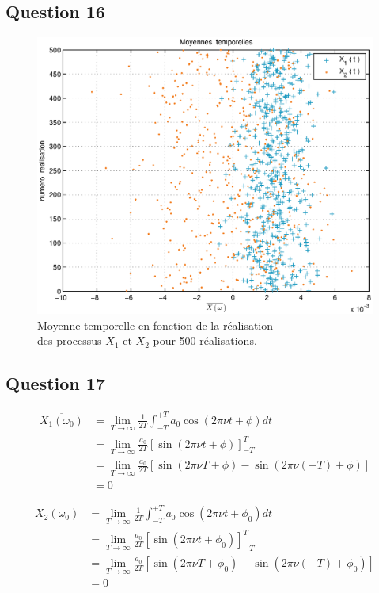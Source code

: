 \documentclass{article}
\begin{document}
\subsection*{Question 16}
\begin{figure}[h]
\centering
\includegraphics[width=12cm]{q16.eps}
\caption{Moyenne temporelle en fonction de la réalisation\\des processus $X_1$ et $X_2$ pour 500 réalisations.}
\label{fig:moytemp}
\end{figure}


\subsection*{Question 17}
\begin{equation}
\begin{aligned}
\overline{X_1(\omega_0)} & = \lim_{T\rightarrow\infty} \frac{1}{2T}\int_{-T}^{+T}a_0\cos(2\pi\nu t + \phi) dt \\
& = \lim_{T\rightarrow\infty} \frac{a_0}{2T}[\sin(2\pi\nu t + \phi)]_{-T}^{T} \\
& = \lim_{T\rightarrow\infty} \frac{a_0}{2T}[\sin(2\pi\nu T + \phi) - \sin(2\pi\nu (-T) + \phi)] \\
& = 0
\end{aligned}
\end{equation}

\begin{equation}
\begin{aligned}
\overline{X_2(\omega_0)} & = \lim_{T\rightarrow\infty} \frac{1}{2T}\int_{-T}^{+T}a_0\cos(2\pi\nu t + \phi_0) dt \\
& = \lim_{T\rightarrow\infty} \frac{a_0}{2T}[\sin(2\pi\nu t + \phi_0)]_{-T}^{T} \\
& = \lim_{T\rightarrow\infty} \frac{a_0}{2T}[\sin(2\pi\nu T + \phi_0) - \sin(2\pi\nu (-T) + \phi_0)] \\
& = 0
\end{aligned}
\end{equation}
\end{document}
